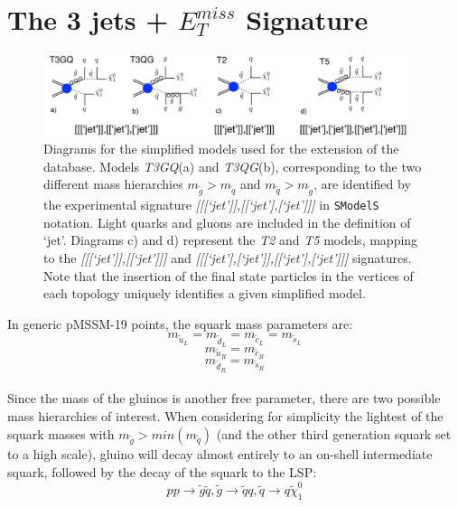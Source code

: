 \documentclass[a4paper,11pt]{article}
\newcommand{\SMO}{\texttt{SModelS\xspace}}
\begin{document}
\section{The 3 jets + $E_T ^{miss}$ Signature }\label{sec::T3GQ}
\begin{figure}
	\begin{center}
		\includegraphics[width=0.95\textwidth]{PLOTS/diagrams.png}
	\end{center}
	\caption{Diagrams for the simplified models used for the extension of the database. Models \textit{T3GQ}(a) and \textit{T3QG}(b), corresponding to the two different mass hierarchies $m_{\tilde g} > m_{\tilde q}$ and $m_{\tilde q} > m_{\tilde g}$, are identified by the experimental signature \textit{[[[`jet']],[[`jet’],[`jet']]]} in \SMO~ notation. Light quarks and gluons are included in the definition of `jet'. Diagrams c) and d) represent the \textit{T2} and \textit{T5} models, mapping to the \textit{[[[`jet’]],[[`jet']]]} and \textit{[[[`jet’],[`jet']],[[`jet’],[`jet']]]} signatures. Note that the insertion of the final state particles in the vertices of each topology uniquely identifies a given simplified model.}
	\label{Diagrams}
\end{figure}
In generic pMSSM-19 points, the squark mass parameters are: 
\begin{equation*}
m_{\tilde u_L} = m_{\tilde d_L} = m_{\tilde c_L} = m_{\tilde s_L} 
\end{equation*}
\begin{equation*}
m_{\tilde u_R} = m_{\tilde c_R} 
\end{equation*}
\begin{equation*}
m_{\tilde d_R} = m_{\tilde s_R}
\end{equation*}
\\
Since the mass of the gluinos is another free parameter, there are two possible mass hierarchies of interest. 
When considering for simplicity the lightest of the squark masses with $m_{\tilde g} > min(m_{\tilde q})$ (and the other third generation squark set to a high scale), gluino will decay almost entirely to an on-shell intermediate squark, followed by the decay of the squark to the LSP:
\begin{equation}\label{decay_TGQ}
p p \rightarrow \tilde g \tilde q , \tilde g \rightarrow \tilde q q , \tilde q \rightarrow q \tilde \chi_1 ^0
\end{equation}
\end{document}
